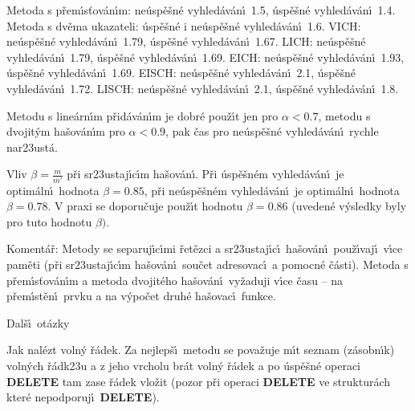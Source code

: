 \phantom{---}Metoda s p\v rem\'\i s\v tov\'an\'\i m: ne\'usp\v e\v sn\'e vyhled\'av\'an\'\i\ 1.5, \'usp\v e\v sn\'e 
vyhled\'av\'an\'\i\ 1.4.\newline 
\phantom{---}Metoda s dv\v ema ukazateli: \'usp\v e\v sn\'e i ne\'usp\v e\v sn\'e vyhled\'av\'an\'\i\  1.6.\newline 
\phantom{---}VICH: ne\'usp\v e\v sn\'e vyhled\'av\'an\'\i\ 1.79, \'usp\v e\v sn\'e vyhled\'av\'an\'\i\ 
1.67.\newline 
\phantom{---}LICH: ne\'usp\v e\v sn\'e vyhled\'av\'an\'\i\ 1.79, \'usp\v e\v sn\'e vyhled\'av\'an\'\i\ 
1.69.\newline 
\phantom{---}EICH: ne\'usp\v e\v sn\'e vyhled\'av\'an\'\i\ 1.93, \'usp\v e\v sn\'e vyhled\'av\'an\'\i\ 
1.69.\newline 
\phantom{---}EISCH: ne\'usp\v e\v sn\'e vyhled\'av\'an\'\i\ 2.1, \'usp\v e\v sn\'e vyhled\'av\'an\'\i\ 
1.72.\newline 
\phantom{---}LISCH: ne\'usp\v e\v sn\'e vyhled\'av\'an\'\i\ 2.1, \'usp\v e\v sn\'e vyhled\'av\'an\'\i\ 
1.8.
\medskip

\flushpar Metodu s line\'arn\'\i m p\v rid\'av\'an\'\i m je dobr\'e pou\v z\'\i t jen pro 
$\alpha <0.7$, metodu s dvojit\'ym ha\v sov\'an\'\i m pro $\alpha 
<0.9$, pak 
\v cas pro ne\'usp\v e\v sn\'e vyhled\'av\'an\'\i\ rychle nar\accent23ust\'a.
\medskip

\flushpar Vliv $\beta =\frac m{m'}$ p\v ri sr\accent23ustaj\'\i c\'\i m ha\v sov\'an\'\i .\newline 
P\v ri 
\'usp\v e\v sn\'em vy\-hled\'av\'an\'\i\ je optim\'aln\'\i\ hodnota $
\beta =0.85$, p\v ri 
ne\'usp\v e\v sn\'em vy\-hled\'av\'an\'\i\ je optim\'aln\'\i\ hodnota $
\beta =0.78$. 
V praxi se doporu\v cuje pou\v z\'\i t hodnotu $\beta =0.86$ (uveden\'e 
v\'ysledky byly pro tuto hodnotu $\beta ).$
\medskip

\flushpar Koment\'a\v r: Metody se separuj\'\i c\'\i mi \v ret\v ezci a 
sr\accent23ustaj\'\i c\'\i\ ha\v sov\'an\'\i\ pou\v z\'\i vaj\'\i\ v\'\i ce pam\v eti (p\v ri 
sr\accent23ustaj\'\i c\'\i m ha\v sov\'an\'\i\ sou\v cet adresovac\'\i\ a 
pomocn\'e \v c\'asti). Metoda s p\v rem\'\i s\v tov\'an\'\i m a metoda 
dvojit\'eho ha\v sov\'an\'\i\ vy\v zaduji v\'\i ce \v casu -- na p\v rem\'\i st\v en\'\i\ 
prvku a na v\'ypo\v cet druh\'e ha\v sovac\'\i\ funkce.

\heading
Dal\v s\'\i\ ot\'azky
\endheading

\flushpar Jak nal\'ezt voln\'y \v r\'adek.\newline 
Za nejlep\v s\'\i\ metodu se pova\v zuje m\'\i t seznam (z\'asobn\'\i k) 
voln\'ych \v r\'adk\accent23u a z jeho vrcholu br\'at voln\'y \v r\'adek 
a po \'usp\v e\v sn\'e operaci {\bf DELETE} tam zase \v r\'adek vlo\v zit 
(pozor p\v ri operaci {\bf DELETE} ve struktur\'ach kter\'e 
nepodporuj\'\i\ {\bf DELETE}).
\medskip

